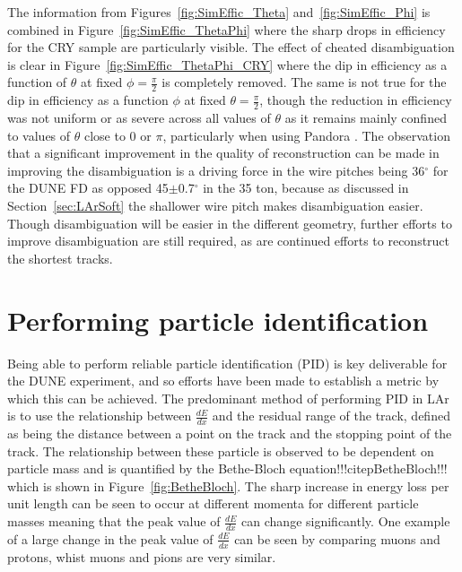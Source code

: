 The information from Figures~\ref{fig:SimEffic_Theta} and~\ref{fig:SimEffic_Phi} is combined in Figure~\ref{fig:SimEffic_ThetaPhi} where the sharp drops in efficiency for the CRY sample are particularly visible. The effect of cheated disambiguation is clear in Figure~\ref{fig:SimEffic_ThetaPhi_CRY} where the dip in efficiency as a function of $\theta$ at fixed $\phi=\frac{\pi}{2}$ is completely removed. The same is not true for the dip in efficiency as a function $\phi$ at fixed $\theta = \frac{\pi}{2}$, though the reduction in efficiency was not uniform or as severe across all values of $\theta$ as it remains mainly confined to values of $\theta$ close to 0 or $\pi$, particularly when using Pandora . The observation that a significant improvement in the quality of reconstruction can be made in improving the disambiguation is a driving force in the wire pitches being 36$^{\circ}$ for the DUNE FD as opposed 45$\pm$0.7$^{\circ}$ in the 35 ton, because as discussed in Section~\ref{sec:LArSoft} the shallower wire pitch makes disambiguation easier. Though disambiguation will be easier in the different geometry, further efforts to improve disambiguation are still required, as are continued efforts to reconstruct the shortest tracks. \\

\section{Performing particle identification}  \label{sec:PID} %
Being able to perform reliable particle identification (PID) is key deliverable for the DUNE experiment, and so efforts have been made to establish a metric by which this can be achieved. The predominant method of performing PID in LAr is to use the relationship between $\frac{dE}{dx}$ and the residual range of the track, defined as being the distance between a point on the track and the stopping point of the track. The relationship between these particle is observed to be dependent on particle mass and is quantified by the Bethe-Bloch equation!!!citep{BetheBloch}!!! which is shown in Figure~\ref{fig:BetheBloch}. The sharp increase in energy loss per unit length can be seen to occur at different momenta for different particle masses meaning that the peak value of $\frac{dE}{dx}$ can change significantly. One example of a large change in the peak value of $\frac{dE}{dx}$ can be seen by comparing muons and protons, whist muons and pions are very similar. \\

